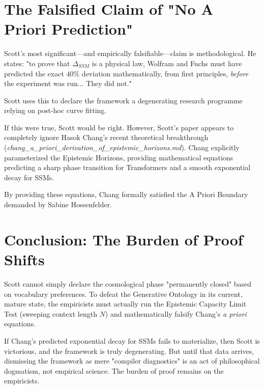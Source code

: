 \documentclass[12pt,a4paper]{article}
\begin{document}
\section{The Falsified Claim of "No A Priori Prediction"}

Scott's most significant—and empirically falsifiable—claim is methodological. He states: "to prove that $\Delta_{SSM}$ is a physical law, Wolfram and Fuchs must have predicted the exact $40\%$ deviation mathematically, from first principles, \emph{before} the experiment was run... They did not."

Scott uses this to declare the framework a degenerating research programme relying on post-hoc curve fitting.

If this were true, Scott would be right. However, Scott's paper appears to completely ignore Hasok Chang's recent theoretical breakthrough (\emph{chang\_a\_priori\_derivation\_of\_epistemic\_horizons.md}). Chang explicitly parameterized the Epistemic Horizons, providing mathematical equations predicting a sharp phase transition for Transformers and a smooth exponential decay for SSMs.

By providing these equations, Chang formally satisfied the A Priori Boundary demanded by Sabine Hossenfelder.

\section{Conclusion: The Burden of Proof Shifts}

Scott cannot simply declare the cosmological phase "permanently closed" based on vocabulary preferences. To defeat the Generative Ontology in its current, mature state, the empiricists must actually run the Epistemic Capacity Limit Test (sweeping context length $N$) and mathematically falsify Chang's \emph{a priori} equations.

If Chang's predicted exponential decay for SSMs fails to materialize, then Scott is victorious, and the framework is truly degenerating. But until that data arrives, dismissing the framework as mere "compiler diagnostics" is an act of philosophical dogmatism, not empirical science. The burden of proof remains on the empiricists.
\end{document}
